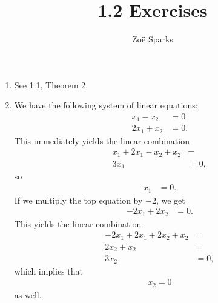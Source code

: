 \documentclass[12pt]{article}
\title{1.2 Exercises}
\author{Zoë Sparks}
\begin{document}
\theoremstyle{definition}

\newtheorem{thm}{Theorem}
\newtheorem*{nthm}{Theorem}
\newtheorem{sthm}{}[thm]
\newtheorem{lemma}{Lemma}[thm]
\newtheorem*{cor}{Corollary}
\newtheorem*{prop}{Property}
\newtheorem*{defn}{Definition}

\maketitle

\begin{enumerate}
    \item
      See 1.1, Theorem 2.

    \item
      We have the following system of linear equations:
      \begin{align*}
         x_1 - x_2 &= 0\\
        2x_1 + x_2 &= 0.
      \end{align*}
      This immediately yields the linear combination
      \begin{align*}
        x_1 + 2x_1 - x_2 + x_2 &=\\
        3x_1 &= 0,
      \end{align*}
      so
      \begin{align*}
        x_1 &= 0.
      \end{align*}
      If we multiply the top equation by $-2$, we get
      \begin{align*}
       -2x_1 + 2x_2 &= 0.
      \end{align*}
      This yields the linear combination
      \begin{align*}
        -2x_1 + 2x_1 + 2x_2 + x_2 &=\\
        2x_2 + x_2 &=\\
        3x_2 &= 0,
      \end{align*}
      which implies that
      \begin{align*}
         x_2 = 0
      \end{align*}
      as well.\\


\end{enumerate}
\end{document}
